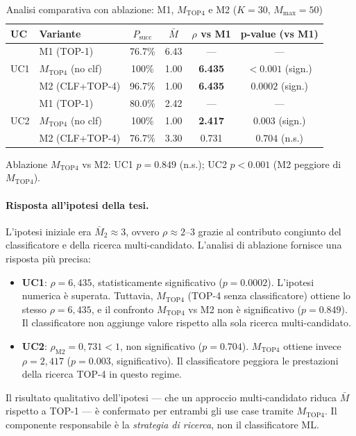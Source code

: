 \begin{onehalfspace}
\begin{table}[H]
\centering
\caption{Analisi comparativa con ablazione: M1, $M_{\text{TOP4}}$ e M2 ($K=30$, $M_{\text{max}}=50$)}
\label{tab:rho_concl}
\begin{tabular}{llcccc}
\hline
\textbf{UC} & \textbf{Variante} & \textbf{$P_{\text{succ}}$} & \textbf{$\bar{M}$} & \textbf{$\rho$ vs M1} & \textbf{p-value (vs M1)} \\
\hline
\multirow{3}{*}{UC1} & M1 (TOP-1)                 & 76.7\% & 6.43 & ---            & --- \\
                     & $M_{\text{TOP4}}$ (no clf) & 100\%  & 1.00 & \textbf{6.435} & ${<}0.001$ (sign.) \\
                     & M2 (CLF+TOP-4)             & 96.7\% & 1.00 & \textbf{6.435} & $0.0002$ (sign.) \\
\hline
\multirow{3}{*}{UC2} & M1 (TOP-1)                 & 80.0\% & 2.42 & ---            & --- \\
                     & $M_{\text{TOP4}}$ (no clf) & 100\%  & 1.00 & \textbf{2.417} & $0.003$ (sign.) \\
                     & M2 (CLF+TOP-4)             & 76.7\% & 3.30 & 0.731          & $0.704$ (n.s.) \\
\hline
\end{tabular}

\smallskip
{\footnotesize Ablazione $M_{\text{TOP4}}$ vs M2: UC1 $p = 0.849$ (n.s.); UC2 $p < 0.001$ (M2 peggiore di $M_{\text{TOP4}}$).}
\end{table}

\paragraph{Risposta all'ipotesi della tesi.}
L'ipotesi iniziale era $\bar{M}_2 \approx 3$, ovvero $\rho \approx 2$--$3$ grazie al contributo congiunto del classificatore e della ricerca multi-candidato. L'analisi di ablazione fornisce una risposta più precisa:
\begin{itemize}
    \item \textbf{UC1}: $\rho = 6{,}435$, statisticamente significativo ($p = 0.0002$). L'ipotesi numerica è superata. Tuttavia, $M_{\text{TOP4}}$ (TOP-4 senza classificatore) ottiene lo stesso $\rho = 6{,}435$, e il confronto $M_{\text{TOP4}}$ vs M2 non è significativo ($p = 0.849$). Il classificatore non aggiunge valore rispetto alla sola ricerca multi-candidato.
    \item \textbf{UC2}: $\rho_{\text{M2}} = 0{,}731 < 1$, non significativo ($p = 0.704$). $M_{\text{TOP4}}$ ottiene invece $\rho = 2{,}417$ ($p = 0.003$, significativo). Il classificatore peggiora le prestazioni della ricerca TOP-4 in questo regime.
\end{itemize}
Il risultato qualitativo dell'ipotesi --- che un approccio multi-candidato riduca $\bar{M}$ rispetto a TOP-1 --- è confermato per entrambi gli use case tramite $M_{\text{TOP4}}$. Il componente responsabile è la \emph{strategia di ricerca}, non il classificatore ML.


\end{onehalfspace}
